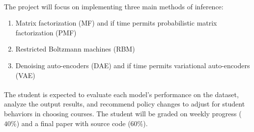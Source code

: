 \documentclass[11pt]{article}
\begin{document}
\paragraph{}
The project will focus on implementing three main methods of inference:
\vspace{-0em}
\begin{enumerate}
\setlength\itemsep{-0.2em}
  \item Matrix factorization (MF) \cite{FeHeKh12} and if time permits
  	probabilistic matrix factorization (PMF) \cite{MnSa07, SaMn08}
  \item Restricted Boltzmann machines (RBM) \cite{Sa09}
  \item Denoising auto-encoders (DAE) \cite{VLLBM10} and if time permits
  	variational auto-encoders (VAE) \cite{KiWe13}
\end{enumerate}

\paragraph{}
The student is expected to evaluate each model's performance on the dataset, 
analyze the output results, and recommend policy changes to adjust 
for student behaviors in choosing courses.
The student will be graded on weekly progress ($40\%$) and a final 
paper with source code ($60\%$).





\end{document}
